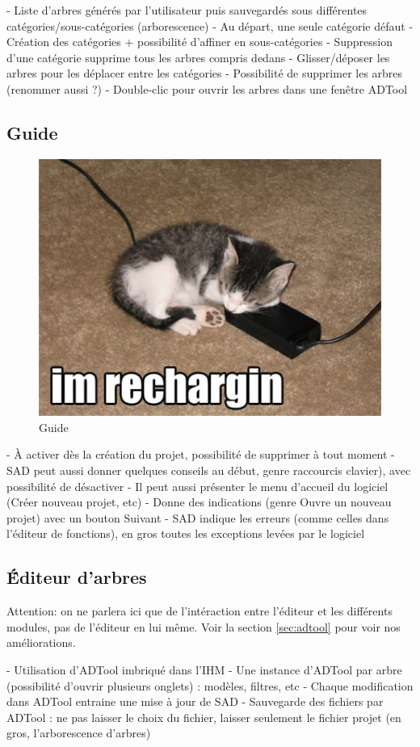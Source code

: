 	- Liste d'arbres générés par l'utilisateur puis sauvegardés sous différentes catégories/sous-catégories (arborescence)
	- Au départ, une seule catégorie défaut
	- Création des catégories + possibilité d'affiner en sous-catégories
	- Suppression d'une catégorie supprime tous les arbres compris dedans
	- Glisser/déposer les arbres pour les déplacer entre les catégories
	- Possibilité de supprimer les arbres (renommer aussi ?)
	- Double-clic pour ouvrir les arbres dans une fenêtre ADTool

	\subsection{Guide}
		\begin{figure}
			\begin{center}
				\includegraphics[width=1\textwidth]{figure/guide.jpg}
			\end{center}
			\caption{Guide}
			\label{fig:guide}
		\end{figure}

	- À activer dès la création du projet, possibilité de supprimer à tout moment 
	- SAD peut aussi donner quelques conseils au début, genre raccourcis clavier), avec possibilité de désactiver
	- Il peut aussi présenter le menu d'accueil du logiciel (Créer nouveau projet, etc)
	- Donne des indications (genre Ouvre un nouveau projet) avec un bouton Suivant
	- SAD indique les erreurs (comme celles dans l'éditeur de fonctions), en gros toutes les exceptions levées par le logiciel

	\subsection{\'Éditeur d'arbres}
		Attention: on ne parlera ici que de l'intéraction entre l'éditeur et les différents modules, pas de l'éditeur en lui même.
		Voir la section \ref{sec:adtool} pour voir nos améliorations.

		- Utilisation d'ADTool imbriqué dans l'IHM
		- Une instance d'ADTool par arbre (possibilité d'ouvrir plusieurs onglets) : modèles, filtres, etc
		- Chaque modification dans ADTool entraine une mise à jour de SAD
		- Sauvegarde des fichiers par ADTool : ne pas laisser le choix du fichier, laisser seulement le fichier projet (en gros, l'arborescence d'arbres)